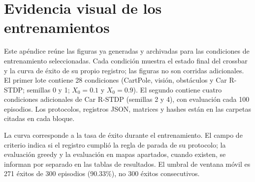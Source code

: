 \chapter{Evidencia visual de los entrenamientos}
\label{ap:evidencia_entrenamientos}

Este ap\'endice re\'une las figuras ya generadas y archivadas para las condiciones de entrenamiento seleccionadas. Cada condici\'on muestra el estado final del crossbar y la curva de \'exito de su propio registro; las figuras no son corridas adicionales. El primer lote contiene 28 condiciones (CartPole, visi\'on, obst\'aculos y Car R-STDP; semillas 0 y 1; $X_0=0.1$ y $X_0=0.9$). El segundo contiene cuatro condiciones adicionales de Car R-STDP (semillas 2 y 4), con evaluaci\'on cada 100 episodios. Los protocolos, registros JSON, matrices y hashes est\'an en las carpetas citadas en cada bloque.

La curva corresponde a la tasa de \'exito durante el entrenamiento. El campo de criterio indica si el registro cumpli\'o la regla de parada de su protocolo; la evaluaci\'on greedy y la evaluaci\'on en mapas apartados, cuando existen, se informan por separado en las tablas de resultados. El umbral de ventana m\'ovil es 271 \'exitos de 300 episodios (90.33\%), no 300 \'exitos consecutivos.
\clearpage


